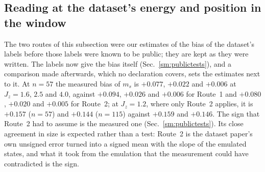 \documentclass[aps,prx,onecolumn,10pt,nofootinbib,longbibliography,floatfix]{revtex4-2}
\theoremstyle{remark}
\newcommand{\Jz}{J_z}
\newcommand{\ms}{m_s}
\begin{document}
\needspace{0.4\textheight} %
\subsection{Reading at the dataset's energy and position in the window}
The two routes of this subsection were our estimates of the bias of the dataset's labels before those labels were
known to be public; they are kept as they were written. The labels now give the bias itself (Sec.~\ref{sm:publictests}),
and a comparison made afterwards, which no declaration covers, sets the estimates next to it. At $n=57$ the measured
bias of $\ms$ is $+0.077$, $+0.022$ and $+0.006$ at $\Jz=1.6$, $2.5$ and $4.0$, against $+0.094$, $+0.026$ and %
$+0.006$ for Route~1 and $+0.080$, $+0.020$ and $+0.005$ for Route~2; at $\Jz=1.2$, where only Route~2 applies, it %
is $+0.157$ ($n=57$) and $+0.144$ ($n=115$) against $+0.159$ and $+0.146$. The sign that Route~2 had to assume is the %
measured one (Sec.~\ref{sm:publictests}). Its close agreement in size is expected rather than a test: Route~2 is the %
dataset paper's own unsigned error turned into a signed mean with the slope of the emulated states, and what it took
from the emulation that the measurement could have contradicted is the sign.


\def\SMcap{Route 1: the bias read at the dataset's reported energy ratio $r$ (its Fig.~2), by interpolation in %
$\log r$ along the perfect-sampler bias-versus-energy curve, with its low--high range and whether $r$ lies inside the
computed curve (\emph{interpolated}) or beyond it (\emph{extrapolated}). The last two columns check the route: the
$\langle Z_i\rangle$ error $\Delta Z$ it predicts at that $r$ against the one the dataset paper reports (its Supp.\
Fig.~11). Read along a row: the route over-predicts $\Delta Z$, so it gives an upper estimate.}\def\SMlab{tab:meth_at_energy} %

\end{document}
